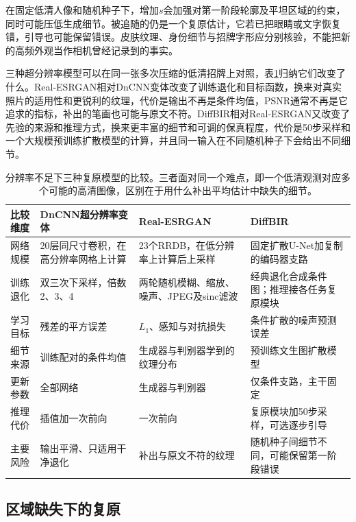 在固定低清人像和随机种子下，增加$s$会加强对第一阶段轮廓及平坦区域的约束，同时可能压低生成细节。被追随的仍是一个复原估计，它若已把眼睛或文字恢复错，引导也可能保留错误。皮肤纹理、身份细节与招牌字形应分别核验，不能把新的高频外观当作相机曾经记录到的事实。

三种超分辨率模型可以在同一张多次压缩的低清招牌上对照，表\ref{tab:vision-sr-compare}归纳它们改变了什么。Real-ESRGAN相对DnCNN变体改变了训练退化和目标函数，换来对真实照片的适用性和更锐利的纹理，代价是输出不再是条件均值，PSNR通常不再是它追求的指标，补出的笔画也可能与原文不符。DiffBIR相对Real-ESRGAN又改变了先验的来源和推理方式，换来更丰富的细节和可调的保真程度，代价是50步采样和一个大规模预训练扩散模型的计算，并且同一输入在不同随机种子下会给出不同细节。

\begin{table}[tbp]
 \centering
 \small
 \begin{tabularx}{\linewidth}{@{}p{18mm}XXX@{}}
  \toprule
  比较维度 & DnCNN超分辨率变体 & Real-ESRGAN & DiffBIR\\
  \midrule
  网络规模 & 20层同尺寸卷积，在高分辨率网格上计算 & 23个RRDB，在低分辨率上计算后上采样 & 固定扩散U-Net加复制的编码器支路\\
  训练退化 & 双三次下采样，倍数2、3、4 & 两轮随机模糊、缩放、噪声、JPEG及sinc滤波 & 经典退化合成条件图；推理接各任务复原模块\\
  学习目标 & 残差的平方误差 & $L_1$、感知与对抗损失 & 条件扩散的噪声预测误差\\
  细节来源 & 训练配对的条件均值 & 生成器与判别器学到的纹理分布 & 预训练文生图扩散模型\\
  更新参数 & 全部网络 & 生成器与判别器 & 仅条件支路，主干固定\\
  推理代价 & 插值加一次前向 & 一次前向 & 复原模块加50步采样，可选逐步引导\\
  主要风险 & 输出平滑、只适用干净退化 & 补出与原文不符的纹理 & 随机种子间细节不同，可能保留第一阶段错误\\
  \bottomrule
 \end{tabularx}
 \caption{分辨率不足下三种复原模型的比较。三者面对同一个难点，即一个低清观测对应多个可能的高清图像，区别在于用什么补出平均估计中缺失的细节。}
 \label{tab:vision-sr-compare}
\end{table}

\subsection{区域缺失下的复原}
\label{sec:vision-restoration-inpainting}
\label{sec:vision-restoration-partial-convolution}

